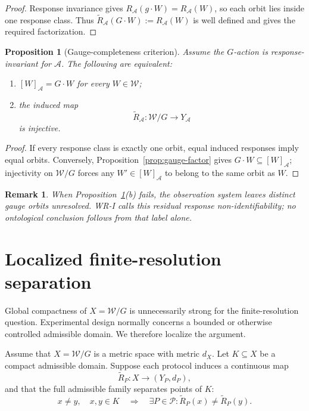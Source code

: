 \documentclass[11pt]{article}
\newtheorem{proposition}[definition]{Proposition}
\newtheorem{remark}[definition]{Remark}
\newcommand{\W}{\mathcal W}
\newcommand{\Pcal}{\mathcal P}
\newcommand{\Acal}{\mathcal A}
\begin{document}
\begin{proof}
Response invariance gives $R_{\Acal}(g\cdot W)=R_{\Acal}(W)$, so each orbit lies
inside one response class. Thus
$\widetilde R_{\Acal}(G\cdot W):=R_{\Acal}(W)$ is well defined and gives the
required factorization.
\end{proof}

\begin{proposition}[Gauge-completeness criterion]\label{prop:gauge-complete}
Assume the $G$-action is response-invariant for $\Acal$. The following are
equivalent:
\begin{enumerate}[label=(\alph*)]
\item $[W]_{\Acal}=G\cdot W$ for every $W\in\W$;
\item the induced map
\[
\widetilde R_{\Acal}:\W/G\to Y_{\Acal}
\]
is injective.
\end{enumerate}
\end{proposition}

\begin{proof}
If every response class is exactly one orbit, equal induced responses imply
equal orbits. Conversely, Proposition~\ref{prop:gauge-factor} gives
$G\cdot W\subseteq[W]_{\Acal}$; injectivity on $\W/G$ forces any
$W'\in[W]_{\Acal}$ to belong to the same orbit as $W$.
\end{proof}

\begin{remark}
When Proposition~\ref{prop:gauge-complete}(b) fails, the observation system
leaves distinct gauge orbits unresolved. WR-I calls this \emph{residual response
non-identifiability}; no ontological conclusion follows from that label alone.
\end{remark}

\section{Localized finite-resolution separation}

Global compactness of $X=\W/G$ is unnecessarily strong for the finite-resolution
question. Experimental design normally concerns a bounded or otherwise
controlled admissible domain. We therefore localize the argument.

Assume that $X=\W/G$ is a metric space with metric $d_X$. Let $K\subseteq X$ be
a compact admissible domain. Suppose each protocol induces a continuous map
\[
\widetilde R_P:X\to(Y_P,d_P),
\]
and that the full admissible family separates points of $K$:
\[
x\neq y,
\quad x,y\in K
\quad\Longrightarrow\quad
\exists P\in\Pcal:
\widetilde R_P(x)\neq\widetilde R_P(y).
\]
\end{document}
